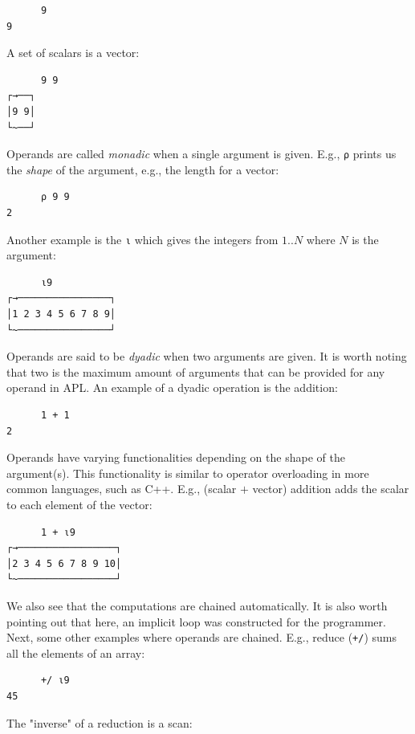 \documentclass{report}
\begin{document}
\begin{verbatim}
      9
9
\end{verbatim}

A set of scalars is a vector:

\begin{verbatim}
      9 9
┌→──┐
│9 9│
└~──┘
\end{verbatim}

Operands are called \emph{monadic} when a single argument is given. E.g., \verb|⍴| prints us the \emph{shape} of the argument, e.g., the length for a vector:

\begin{verbatim}
      ⍴ 9 9
2
\end{verbatim}

Another example is the \verb|⍳| which gives the integers from $1..N$ where $N$ is the argument:

\begin{verbatim}
      ⍳9
┌→────────────────┐
│1 2 3 4 5 6 7 8 9│
└~────────────────┘
\end{verbatim}

Operands are said to be \emph{dyadic} when two arguments are given. It is worth noting that two is the maximum amount of arguments that can be provided for any operand in APL. An example of a dyadic operation is the addition:

\begin{verbatim}
      1 + 1
2
\end{verbatim}

Operands have varying functionalities depending on the shape of the argument(s). This functionality is similar to operator overloading in more common languages, such as C++. E.g., (scalar $+$ vector) addition adds the scalar to each element of the vector:

\begin{verbatim}
      1 + ⍳9
┌→─────────────────┐
│2 3 4 5 6 7 8 9 10│
└~─────────────────┘
\end{verbatim}

We also see that the computations are chained automatically. It is also worth pointing out that here, an implicit loop was constructed for the programmer. Next, some other examples where operands are chained. E.g., reduce (\verb|+/|) sums all the elements of an array:

\begin{verbatim}
      +/ ⍳9
45
\end{verbatim}

The "inverse" of a reduction is a scan:
\end{document}

